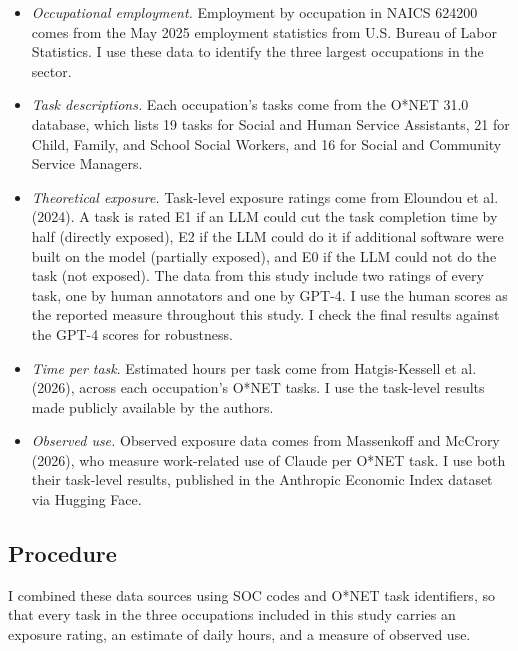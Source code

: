 \begin{itemize}
\item
  \emph{Occupational employment.} Employment by occupation in NAICS 624200 comes from the May 2025 employment statistics from U.S. Bureau of Labor Statistics. I use these data to identify the three largest occupations in the sector.
\item
  \emph{Task descriptions.} Each occupation's tasks come from the O*NET 31.0 database, which lists 19 tasks for Social and Human Service Assistants, 21 for Child, Family, and School Social Workers, and 16 for Social and Community Service Managers.
\item
  \emph{Theoretical exposure.} Task-level exposure ratings come from Eloundou et al. (2024). A task is rated E1 if an LLM could cut the task completion time by half (directly exposed), E2 if the LLM could do it if additional software were built on the model (partially exposed), and E0 if the LLM could not do the task (not exposed). The data from this study include two ratings of every task, one by human annotators and one by GPT-4. I use the human scores as the reported measure throughout this study. I check the final results against the GPT-4 scores for robustness.
\item
  \emph{Time per task}. Estimated hours per task come from Hatgis-Kessell et al. (2026), across each occupation's O*NET tasks. I use the task-level results made publicly available by the authors.
\item
  \emph{Observed use.} Observed exposure data comes from Massenkoff and McCrory (2026), who measure work-related use of Claude per O*NET task. I use both their task-level results, published in the Anthropic Economic Index dataset via Hugging Face.
\end{itemize}

\subsection{Procedure}

I combined these data sources using SOC codes and O*NET task identifiers, so that every task in the three occupations included in this study carries an exposure rating, an estimate of daily hours, and a measure of observed use.

